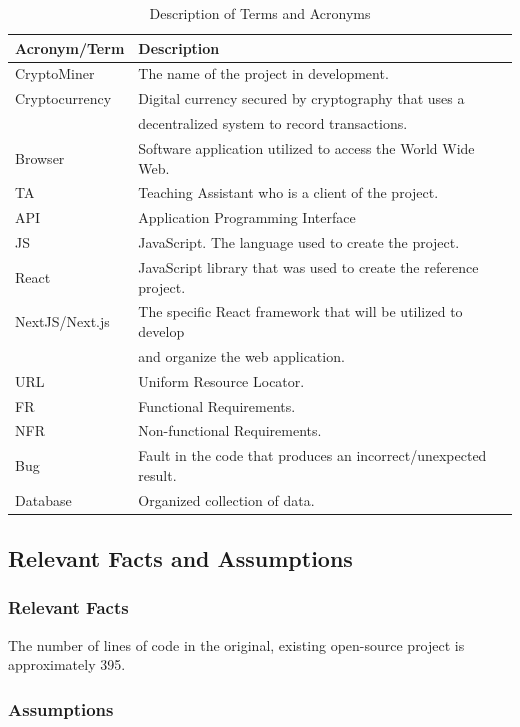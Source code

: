 \documentclass[12pt, titlepage]{article}
\begin{document}
\begin{table}[!h]
    \begin{tabular}{lll} \toprule
        \textbf{Acronym/Term} & \textbf{Description}\\ \midrule
        CryptoMiner & The name of the project in development. \\ 
        Cryptocurrency & Digital currency secured by cryptography that uses a \\ & decentralized system to record transactions. \\ 
        Browser & Software application utilized to access the World Wide Web. \\ 
        TA & Teaching Assistant who is a client of the project. \\ 
        API & Application Programming Interface \\
        JS & JavaScript. The language used to create the project. \\
        React & JavaScript library that was used to create the reference project. \\
        NextJS/Next.js & The specific React framework that will be utilized to develop \\ & and organize the web application. \\ 
        URL & Uniform Resource Locator. \\
        FR & Functional Requirements. \\
        NFR & Non-functional Requirements. \\
        Bug & Fault in the code that produces an incorrect/unexpected result. \\
        Database & Organized collection of data. \\
        \bottomrule
    \end{tabular}
    \caption{Description of Terms and Acronyms}
    \label{tab:my_label}
\end{table}

\subsection{Relevant Facts and Assumptions}
\subsubsection{Relevant Facts}
The number of lines of code in the original, existing open-source project is approximately 395.
\subsubsection{Assumptions}
\end{document}

